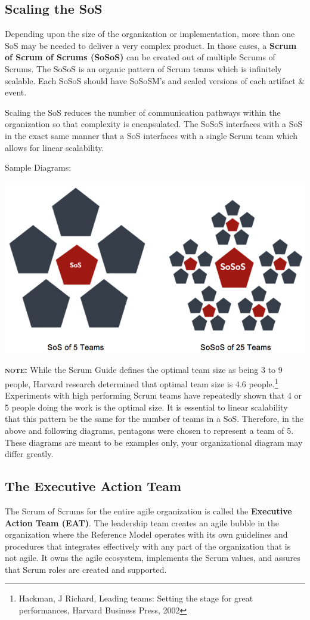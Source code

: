 \documentclass[12pt,a4paper,parskip=full]{scrartcl}
\begin{document}
\subsection{Scaling the SoS}
Depending upon the size of the organization or implementation, more than
one SoS may be needed to deliver a very complex product. In those cases, a
\textbf{Scrum of Scrum of Scrums (SoSoS)} can be created out of multiple
Scrums of Scrums. The SoSoS is an organic pattern of Scrum teams which is
infinitely scalable. Each SoSoS should have SoSoSM's and scaled versions of
each artifact \& event.

Scaling the SoS reduces the number of communication pathways within the
organization so that complexity is encapsulated. The SoSoS interfaces with
a SoS in the exact same manner that a SoS interfaces with a single Scrum
team which allows for linear scalability.

\pagebreak
Sample Diagrams:

\includegraphics[width=1.0\linewidth]{Sos-R2.png}

\textbf{\textsc{note:}} While the Scrum Guide defines the optimal team size as being
3 to 9 people, Harvard research determined that optimal team size is 4.6
people.\footnote{Hackman, J Richard, Leading teams: Setting the stage for
great performances, Harvard Business Press, 2002} Experiments with high
performing Scrum teams have repeatedly shown that 4 or 5 people doing the
work is the optimal size. It is essential to linear scalability that this
pattern be the same for the number of teams in a SoS. Therefore, in the
above and following diagrams, pentagons were chosen to represent a team of
5. These diagrams are meant to be examples only, your organizational
diagram may differ greatly.

\subsection{The Executive Action Team}
The Scrum of Scrums for the entire agile organization is called the
\textbf{Executive Action Team (EAT)}. The leadership team creates an agile bubble
in the organization where the Reference Model operates with 
its own guidelines and procedures that integrates effectively 
with any part of the organization that is not agile. It owns the agile ecosystem, 
implements the Scrum values, and assures that 
Scrum roles are created and supported.
\end{document}
